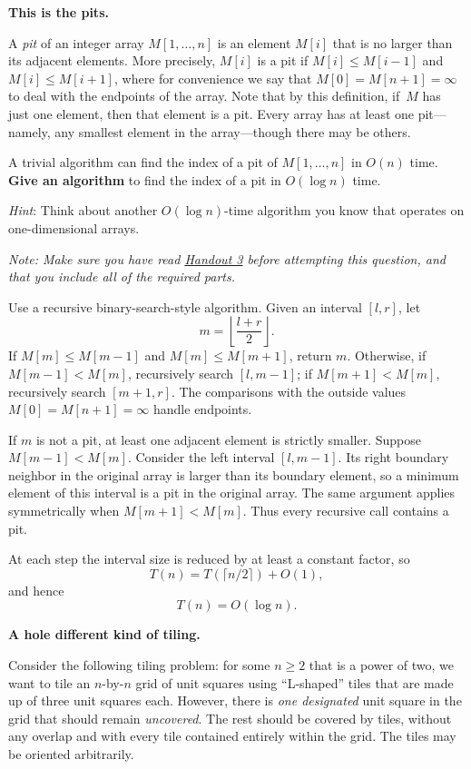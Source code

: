 \documentclass[11pt,addpoints,answers]{exam}
\theoremstyle{plain}            %
\theoremstyle{definition}       %
\theoremstyle{remark}           %
\newcommand{\hint}[1]{
\emph{Hint}: #1
}
\begin{document}
\begin{questions}
 \question[15] \textbf{This is the pits.} \nopagebreak

  A \emph{pit} of an integer array $M[1,\ldots, n]$ is an element $M[i]$ that is no larger than its adjacent elements.
  More precisely, $M[i]$ is a pit if $M[i] \leq M[i-1]$ and $M[i] \leq M[i+1]$, where for convenience we say that $M[0] = M[n+1] = \infty$ to deal with the endpoints of the array.
  Note that by this definition, if~$M$ has just one element, then that element is a pit.
  Every array has at least one pit---namely, any smallest element in the array---though there may be others.
    
  A trivial algorithm can find the index of a pit of $M[1,\ldots,n]$ in $O(n)$ time.
  \textbf{Give an algorithm} to find the index of a pit in $O(\log n)$ time.
      
  \hint{Think about another $O(\log n)$-time algorithm you know that operates on one-dimensional arrays.}

   \textit{Note: Make sure you have read \href{https://drive.google.com/file/d/1LzHBuS9pBCy12QMJ91PyLaDOnNW4NFn0/view?usp=drive_link}{Handout 3} before attempting this question, and that you include all of the required parts.}
      
  \begin{solution}
Use a recursive binary-search-style algorithm. Given an interval \([l,r]\), let
\[
m=\left\lfloor\frac{l+r}{2}\right\rfloor.
\]
If \(M[m]\le M[m-1]\) and \(M[m]\le M[m+1]\), return \(m\). Otherwise, if \(M[m-1]<M[m]\), recursively search \([l,m-1]\); if \(M[m+1]<M[m]\), recursively search \([m+1,r]\). The comparisons with the outside values \(M[0]=M[n+1]=\infty\) handle endpoints.

If \(m\) is not a pit, at least one adjacent element is strictly smaller. Suppose \(M[m-1]<M[m]\). Consider the left interval \([l,m-1]\). Its right boundary neighbor in the original array is larger than its boundary element, so a minimum element of this interval is a pit in the original array. The same argument applies symmetrically when \(M[m+1]<M[m]\). Thus every recursive call contains a pit.

At each step the interval size is reduced by at least a constant factor, so
\[
T(n)=T(\lceil n/2\rceil)+O(1),
\]
and hence
\[
T(n)=O(\log n).
\]
\end{solution}



  \question \textbf{A hole different kind of tiling.} 

  Consider the following tiling problem: for some $n \geq 2$ that is a power of two, we want to tile an $n$-by-$n$ grid of unit squares using ``L-shaped'' tiles that are made up of three unit squares each.
  However, there is \emph{one designated} unit square in the grid that should remain \emph{uncovered}.
  The rest should be covered by tiles, without any overlap and with every tile contained entirely within the grid.
  The tiles may be oriented arbitrarily.


\end{questions}
\end{document}
